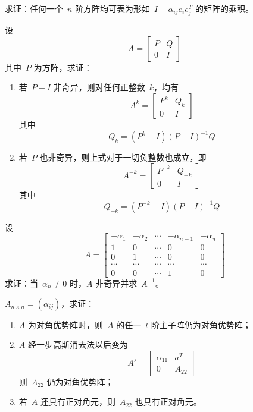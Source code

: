 \documentclass[twoside,openright]{book}
\begin{document}
\begin{CJK*}{UTF8}{}
\begin{quest}
\label{quest:60}
求证：任何一个\ $n$ 阶方阵均可表为形如\ $I+\alpha_{ij}e_ie_j^T$ 的矩阵的乘积。
\end{quest}

\begin{quest}
\label{quest:61}
设
\[
A=
\begin{bmatrix}
P & Q \\
0 & I
\end{bmatrix}
\]
其中\ $P$ 为方阵，求证：
\begin{enumerate}
\item
若\ $P-I$ 非奇异，则对任何正整数\ $k$，均有
\[
A^k=
\begin{bmatrix}
P^k & Q_k \\
0 & I
\end{bmatrix}
\]
其中
\[
Q_k=(P^k-I)(P-I)^{-1}Q
\]
\item
若\ $P$ 也非奇异，则上式对于一切负整数也成立，即
\[
A^{-k}=
\begin{bmatrix}
P^{-k} & Q_{-k} \\
0      & I
\end{bmatrix}
\]
其中
\[
Q_{-k}=(P^{-k}-I)(P-I)^{-1}Q
\]
\end{enumerate}
\end{quest}

\begin{quest}
\label{quest:62}
设
\[
A=
\begin{bmatrix}
-\alpha_1 & -\alpha_2 & \dotsm & -\alpha_{n-1} & -\alpha_n \\
1         & 0         & \dotsm & 0             & 0         \\
0         & 1         & \dotsm & 0             & 0         \\
\dotsm    & \dotsm    & \dotsm & \dotsm        & \dotsm    \\
0         & 0         & \dotsm & 1             & 0
\end{bmatrix}
\]
求证：当\ $\alpha_n\neq0$ 时，$A$ 非奇异并求\ $A^{-1}$。
\end{quest}

\begin{quest}
\label{quest:63}
$A_{n\times n}=(\alpha_{ij})$，求证：
\begin{enumerate}
\item
$A$ 为对角优势阵时，则\ $A$ 的任一\ $t$ 阶主子阵仍为对角优势阵；
\item
$A$ 经一步高斯消去法以后变为
\[
A'=\begin{bmatrix}\alpha_{11}&a^T\\0&A_{22}\end{bmatrix}
\]
则\ $A_{22}$ 仍为对角优势阵；
\item
若\ $A$ 还具有正对角元，则\ $A_{22}$ 也具有正对角元。
\end{enumerate}
\end{quest}


\end{CJK*}
\end{document}
